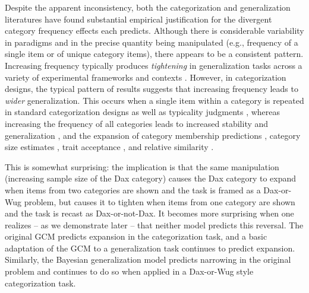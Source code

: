 \documentclass[doc,apacite]{apa6}
\begin{document}
Despite the apparent inconsistency, both the categorization and generalization literatures have found substantial empirical justification for the divergent category frequency effects each predicts. Although there is considerable variability in paradigms and in the precise quantity being manipulated (e.g., frequency of a single item or of unique  category items), there appears to be a consistent pattern.
Increasing frequency typically produces {\it tightening} in generalization tasks across a variety of experimental frameworks and contexts \cite{tenenbaum1999bayesian, tenenbaum2000rules, sanjana2003bayesian, xu2007word, xu2007sensitivity, franktenenbaum2011, lewis2016understanding, navarroperfors2010, navarro2012sampling, vong2013role, hsugriffiths16}. However, in categorization designs, the typical pattern of results suggests that increasing frequency leads to {\it wider} generalization. This occurs when a single item within a category is repeated in standard categorization designs \cite{nosofsky1991tests,nosofsky1988similarity,harris2008prior} as well as typicality judgments \cite{vandierendonck1988typically,williams1986judging}, whereas increasing the frequency of all categories leads to increased stability and generalization \cite{donald1973prototype, homa1976category, breen1986classification, homa1987changing,homa1991instance}, and the expansion of category membership predictions \cite{barsalou1985ideals}, category size estimates \cite{beyth1977direct}, trait acceptance \cite{boseovski2006children}, and relative similarity \cite{polk2002rating}.

This is somewhat surprising: the implication is that the same manipulation (increasing sample size of the Dax category) causes the Dax category to expand when items from two categories are shown and the task is framed as a Dax-or-Wug problem, but causes it to tighten when items from one category are shown and the task is recast as Dax-or-not-Dax. It becomes more surprising when one realizes -- as we demonstrate later -- that neither model predicts this reversal. The original GCM predicts expansion in the categorization task, and a basic adaptation of the GCM to a generalization task continues to predict expansion. Similarly, the Bayesian generalization model predicts narrowing in the original problem and continues to do so when applied in a Dax-or-Wug style categorization task.
\end{document}
